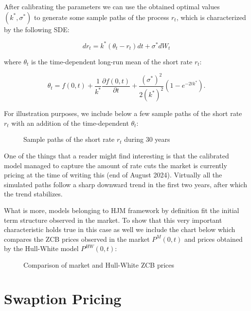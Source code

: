 \documentclass[titlepage, 12pt]{article}
\begin{document}
	After calibrating the parameters we can use the obtained optimal values $(k^*,\sigma^*)$ to generate some sample paths of the process $r_t$, which is characterized by the following SDE:
	
	\begin{equation}
		dr_t = k^*\left( \theta_t - r_t \right)dt + \sigma^* dW_t
	\end{equation}
	
	where $\theta_t$ is the time-dependent long-run mean of the short rate $r_t$:
	
	\begin{equation}
		\theta_t = f(0,t) + \frac{1}{k^*}\frac{\partial f(0,t)}{\partial t} + \frac{(\sigma^*)^2}{2(k^*)^2}\left(1-e^{-2tk^*}\right).
	\end{equation}
	
	For illustration purposes, we include below a few sample paths of the short rate $r_t$ with an addition of the time-dependent $\theta_t$:
	
	\begin{figure}[H]
		\centering
		
		\caption{Sample paths of the short rate $r_t$ during 30 years}
		\label{fig:sample_paths}
	\end{figure}
	
	One of the things that a reader might find interesting is that the calibrated model managed to capture the amount of rate cuts the market is currently pricing at the time of writing this (end of August 2024). Virtually all the simulated paths follow a sharp downward trend in the first two years, after which the trend stabilizes.
	
	What is more, models belonging to HJM framework by definition fit the initial term structure observed in the market. To show that this very important characteristic holds true in this case as well we include the chart below which compares the ZCB prices observed in the market $P^M(0,t)$ and prices obtained by the Hull-White model $P^{HW}(0,t)$:
	
	\begin{figure}[h]
		\centering
		
		\caption{Comparison of market and Hull-White ZCB prices}
		\label{fig:tsm_fit}
	\end{figure}
	
	
	\section{Swaption Pricing}\label{swaption-pricing}
	
\end{document}
